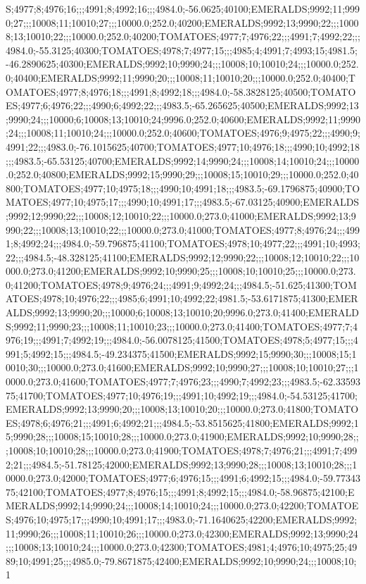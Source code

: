 S;4977;8;4976;16;;;4991;8;4992;16;;;4984.0;-56.0625;40100;EMERALDS;9992;11;9990;27;;;10008;11;10010;27;;;10000.0;252.0;40200;EMERALDS;9992;13;9990;22;;;10008;13;10010;22;;;10000.0;252.0;40200;TOMATOES;4977;7;4976;22;;;4991;7;4992;22;;;4984.0;-55.3125;40300;TOMATOES;4978;7;4977;15;;;4985;4;4991;7;4993;15;4981.5;-46.2890625;40300;EMERALDS;9992;10;9990;24;;;10008;10;10010;24;;;10000.0;252.0;40400;EMERALDS;9992;11;9990;20;;;10008;11;10010;20;;;10000.0;252.0;40400;TOMATOES;4977;8;4976;18;;;4991;8;4992;18;;;4984.0;-58.3828125;40500;TOMATOES;4977;6;4976;22;;;4990;6;4992;22;;;4983.5;-65.265625;40500;EMERALDS;9992;13;9990;24;;;10000;6;10008;13;10010;24;9996.0;252.0;40600;EMERALDS;9992;11;9990;24;;;10008;11;10010;24;;;10000.0;252.0;40600;TOMATOES;4976;9;4975;22;;;4990;9;4991;22;;;4983.0;-76.1015625;40700;TOMATOES;4977;10;4976;18;;;4990;10;4992;18;;;4983.5;-65.53125;40700;EMERALDS;9992;14;9990;24;;;10008;14;10010;24;;;10000.0;252.0;40800;EMERALDS;9992;15;9990;29;;;10008;15;10010;29;;;10000.0;252.0;40800;TOMATOES;4977;10;4975;18;;;4990;10;4991;18;;;4983.5;-69.1796875;40900;TOMATOES;4977;10;4975;17;;;4990;10;4991;17;;;4983.5;-67.03125;40900;EMERALDS;9992;12;9990;22;;;10008;12;10010;22;;;10000.0;273.0;41000;EMERALDS;9992;13;9990;22;;;10008;13;10010;22;;;10000.0;273.0;41000;TOMATOES;4977;8;4976;24;;;4991;8;4992;24;;;4984.0;-59.796875;41100;TOMATOES;4978;10;4977;22;;;4991;10;4993;22;;;4984.5;-48.328125;41100;EMERALDS;9992;12;9990;22;;;10008;12;10010;22;;;10000.0;273.0;41200;EMERALDS;9992;10;9990;25;;;10008;10;10010;25;;;10000.0;273.0;41200;TOMATOES;4978;9;4976;24;;;4991;9;4992;24;;;4984.5;-51.625;41300;TOMATOES;4978;10;4976;22;;;4985;6;4991;10;4992;22;4981.5;-53.6171875;41300;EMERALDS;9992;13;9990;20;;;10000;6;10008;13;10010;20;9996.0;273.0;41400;EMERALDS;9992;11;9990;23;;;10008;11;10010;23;;;10000.0;273.0;41400;TOMATOES;4977;7;4976;19;;;4991;7;4992;19;;;4984.0;-56.0078125;41500;TOMATOES;4978;5;4977;15;;;4991;5;4992;15;;;4984.5;-49.234375;41500;EMERALDS;9992;15;9990;30;;;10008;15;10010;30;;;10000.0;273.0;41600;EMERALDS;9992;10;9990;27;;;10008;10;10010;27;;;10000.0;273.0;41600;TOMATOES;4977;7;4976;23;;;4990;7;4992;23;;;4983.5;-62.3359375;41700;TOMATOES;4977;10;4976;19;;;4991;10;4992;19;;;4984.0;-54.53125;41700;EMERALDS;9992;13;9990;20;;;10008;13;10010;20;;;10000.0;273.0;41800;TOMATOES;4978;6;4976;21;;;4991;6;4992;21;;;4984.5;-53.8515625;41800;EMERALDS;9992;15;9990;28;;;10008;15;10010;28;;;10000.0;273.0;41900;EMERALDS;9992;10;9990;28;;;10008;10;10010;28;;;10000.0;273.0;41900;TOMATOES;4978;7;4976;21;;;4991;7;4992;21;;;4984.5;-51.78125;42000;EMERALDS;9992;13;9990;28;;;10008;13;10010;28;;;10000.0;273.0;42000;TOMATOES;4977;6;4976;15;;;4991;6;4992;15;;;4984.0;-59.7734375;42100;TOMATOES;4977;8;4976;15;;;4991;8;4992;15;;;4984.0;-58.96875;42100;EMERALDS;9992;14;9990;24;;;10008;14;10010;24;;;10000.0;273.0;42200;TOMATOES;4976;10;4975;17;;;4990;10;4991;17;;;4983.0;-71.1640625;42200;EMERALDS;9992;11;9990;26;;;10008;11;10010;26;;;10000.0;273.0;42300;EMERALDS;9992;13;9990;24;;;10008;13;10010;24;;;10000.0;273.0;42300;TOMATOES;4981;4;4976;10;4975;25;4989;10;4991;25;;;4985.0;-79.8671875;42400;EMERALDS;9992;10;9990;24;;;10008;10;1